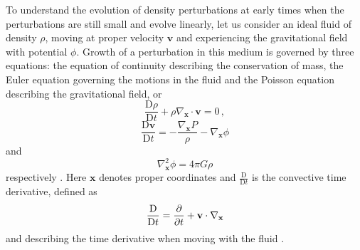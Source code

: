 \documentclass[english, oneside]{HYgradu}
\begin{document}
To understand the evolution of density perturbations at early times when the perturbations are still small and evolve linearly, let us consider an ideal fluid of density $\rho$, moving at proper velocity $\mathbf{v}$ and experiencing the gravitational field with potential $\phi$. Growth of a perturbation in this medium is governed by three equations: the equation of continuity describing the conservation of mass, the Euler equation governing the motions in the fluid and the Poisson equation describing the gravitational field, or
\begin{equation}\label{continuity}
\frac{\textrm{D}\rho}{\textrm{D}t} + \rho \nabla_\mathbf{x}\cdot{\mathbf{v}} = 0 \,,
\end{equation}
\begin{equation}\label{euler}
\frac{\textrm{D}\mathbf{v}}{\textrm{D}t} = - \frac{\nabla_\mathbf{x} P}{\rho} - \nabla_\mathbf{x}\phi
\end{equation}
and
\begin{equation}\label{poisson}
\nabla_\mathbf{x}^2\phi = 4\pi G\rho
\end{equation}
respectively \citep{mo2010galaxy}. Here $\mathbf{x}$ denotes proper coordinates and $\frac{\textrm{D}}{\textrm{D}t}$ is the convective time derivative, defined as
\begin{equation}
\frac{\textrm{D}}{\textrm{D}t} = \pdv{}{t} + \mathbf{v}\cdot\nabla_\mathbf{x}
\end{equation}
and describing the time derivative when moving with the fluid \citep{mo2010galaxy}.
\end{document}
